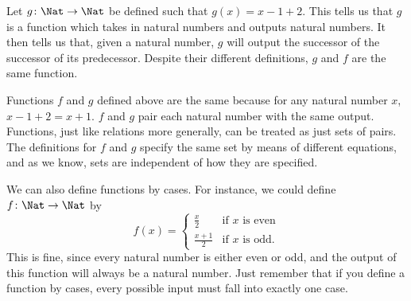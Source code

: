 \documentclass[../../include/open-logic-section]{subfiles}
\begin{document}
\begin{ex}
Let $g \colon \Nat \to \Nat$ be defined such that $g(x) = x-1+2$. This tells us that $g$ is a function which takes in natural numbers and outputs natural numbers. It then tells us that, given a natural number, $g$ will output the successor of the successor of its predecessor. Despite their different definitions, $g$ and $f$ are the same function.
\end{ex}

\begin{explain}
Functions $f$ and $g$ defined above are the same because for any natural number $x$, $x-1+2 = x+1$. $f$ and $g$ pair each natural number with the same output. Functions, just like relations more generally, can be treated as just sets of pairs. The definitions for $f$ and $g$ specify the same set by means of different equations, and as we know, sets are independent of how they are specified.
\end{explain}

\begin{ex}
We can also define functions by cases. For instance, we could define
$f \colon \Nat \to \Nat$  by 
\[
f(x) = 
\begin{cases}
  \frac{x}{2} & \text{if $x$ is even} \\
  \frac{x+1}{2} & \text{if $x$ is odd.}
\end{cases}
\]
This is fine, since every natural number is either even or odd, and the output of this function will always be a natural number. Just remember that if you define a function by cases, every possible input must fall into exactly one case.
\end{ex}
\end{document}
